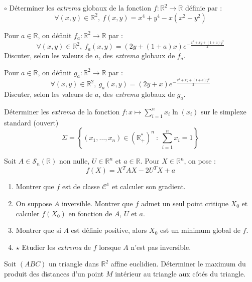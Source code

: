 \documentclass[french,a4paper]{article}
\newcommand{\R}{\mathbb{R}}
\newcommand{\st}{^*}
\theoremstyle{plain}
\theoremstyle{definition}
\theoremstyle{remark}
\begin{document}
\begin{ex}[Moulin.36]{$\circ$}
	Déterminer les \textit{extrema} globaux de la fonction $f:\R^2\to\R$ définie par : $$\forall (x,y)\in\R^2,\ f(x,y)=x^4+y^4-x(x^2-y^2)$$
\end{ex}

\begin{ex}[Moulin.37]{}
	Pour $a\in\R$, on définit $f_a:\R^2\to\R$ par : $$\forall (x,y)\in\R^2,\ f_a(x,y)=(2y+(1+a)x)e^{\displaystyle-\frac{x^2+xy+(1+a)y^2}{2}}$$ Discuter, selon les valeurs de $a$, des \textit{extrema} globaux de $f_a$.
\end{ex}

\begin{ex}[Moulin.38]{}
	Pour $a\in\R$, on définit $g_a:\R^2\to\R$ par : $$\forall (x,y)\in\R^2,\ g_a(x,y)=(2y+x)e^{\displaystyle-\frac{x^2+xy+(1+a)y^2}{2}}$$ Discuter, selon les valeurs de $a$, des \textit{extrema} globaux de $g_a$.
\end{ex}

\begin{ex}[Moulin.39]{}
	Déterminer les \textit{extrema} de la fonction $f:x\mapsto\displaystyle\sum_{i=1}^{n}x_i\ln(x_i)$ sur le simplexe standard (ouvert) $$\Sigma=\left\{(x_1,\ldots,x_n)\in(\R_+\st)^n\ : \ \sum_{i=1}^{n}x_i=1\right\}$$
\end{ex}

\begin{ex}[Moulin.40]{}
	Soit $A\in\mathcal{S}_n(\R)$ non nulle, $U\in\R^n$ et $a\in\R$. Pour $X\in\R^n$, on pose : $$f(X)=X^TAX-2U^TX+a$$
	\begin{enumerate}
		\item Montrer que $f$ est de classe $\mathcal{C}^1$ et calculer son gradient.
		\item On suppose $A$ inversible. Montrer que $f$ admet un seul point critique $X_0$ et calculer $f(X_0)$ en fonction de $A$, $U$ et $a$.
		\item Montrer que si $A$ est définie positive, alors $X_0$ est un minimum global de $f$.
		\item $\star$ Etudier les \textit{extrema} de $f$ lorsque $A$ n'est pas inversible.
	\end{enumerate}
\end{ex}

\begin{ex}[Moulin.41]{}
	Soit $(ABC)$ un triangle dans $\R^2$ affine euclidien. Déterminer le maximum du produit des distances d'un point $M$ intérieur au triangle aux côtés du triangle.
\end{ex}
\end{document}
